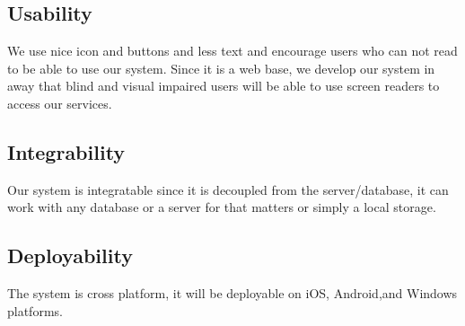 \documentclass[a4paper,12pt]{article}
\begin{document}
\subsection{Usability} We use nice icon and buttons and less text and encourage users who can not read to be able to use our system. Since it is a web base, we develop our system in away that blind and visual impaired users will be able to use screen readers to access our services.
\subsection{Integrability} Our system is integratable since it is decoupled from the server/database, it can work with any database or a server for that matters or simply a local storage. 
\subsection{Deployability} The system is cross platform, it will be deployable on iOS, Android,and Windows platforms.	
\end{document}
